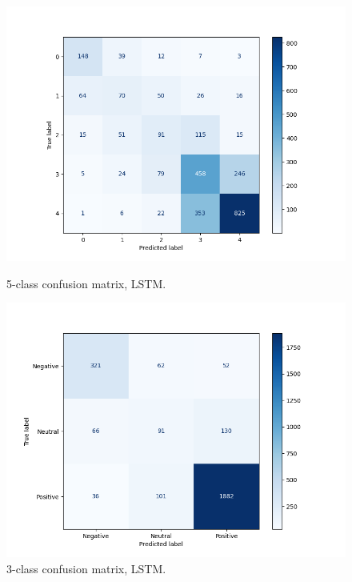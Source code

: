             \begin{figure}[H]
              \centering
              \begin{minipage}{0.48\textwidth}
                \centering
                \includegraphics[width=\textwidth]{images/confusion_matrix_lstm.png}
                \caption{5-class confusion matrix, LSTM.}
              \end{minipage}\hfill
              \begin{minipage}{0.48\textwidth}
                \centering
                \includegraphics[width=\textwidth]{images/confusion_matrix_lstm_sentiment.png}
                \caption{3-class confusion matrix, LSTM.}
              \end{minipage}  
            \end{figure} 

